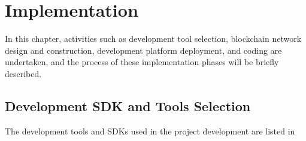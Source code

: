 \chapter{Implementation}
In this chapter, activities such as development tool selection, blockchain network design and construction, development platform deployment, and coding are undertaken, and the process of these implementation phases will be briefly described.

\section{Development SDK and Tools Selection}
The development tools and SDKs used in the project development are listed in 
